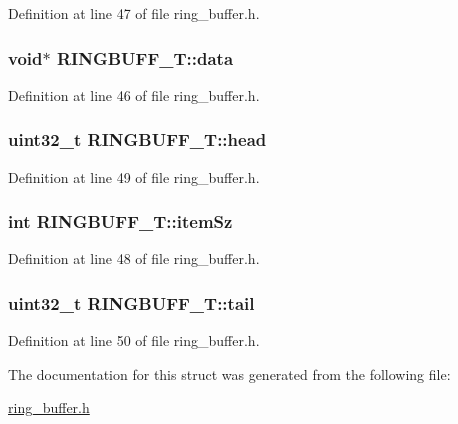 Definition at line 47 of file ring\+\_\+buffer.\+h.

\subsubsection[{\texorpdfstring{data}{data}}]{\setlength{\rightskip}{0pt plus 5cm}void$\ast$ R\+I\+N\+G\+B\+U\+F\+F\+\_\+\+T\+::data}\hypertarget{structRINGBUFF__T_a72858dc34b0dd618118388924c28967c}{}\label{structRINGBUFF__T_a72858dc34b0dd618118388924c28967c}


Definition at line 46 of file ring\+\_\+buffer.\+h.

\subsubsection[{\texorpdfstring{head}{head}}]{\setlength{\rightskip}{0pt plus 5cm}uint32\+\_\+t R\+I\+N\+G\+B\+U\+F\+F\+\_\+\+T\+::head}\hypertarget{structRINGBUFF__T_a30c2ea59e510513e18bb22b4c783e6bb}{}\label{structRINGBUFF__T_a30c2ea59e510513e18bb22b4c783e6bb}


Definition at line 49 of file ring\+\_\+buffer.\+h.

\subsubsection[{\texorpdfstring{item\+Sz}{itemSz}}]{\setlength{\rightskip}{0pt plus 5cm}int R\+I\+N\+G\+B\+U\+F\+F\+\_\+\+T\+::item\+Sz}\hypertarget{structRINGBUFF__T_a8d36d35edc73f36f7f81e98693ef3259}{}\label{structRINGBUFF__T_a8d36d35edc73f36f7f81e98693ef3259}


Definition at line 48 of file ring\+\_\+buffer.\+h.

\subsubsection[{\texorpdfstring{tail}{tail}}]{\setlength{\rightskip}{0pt plus 5cm}uint32\+\_\+t R\+I\+N\+G\+B\+U\+F\+F\+\_\+\+T\+::tail}\hypertarget{structRINGBUFF__T_a490ce2de2b2e234beeafdb9f9298f20f}{}\label{structRINGBUFF__T_a490ce2de2b2e234beeafdb9f9298f20f}


Definition at line 50 of file ring\+\_\+buffer.\+h.



The documentation for this struct was generated from the following file\+:\begin{DoxyCompactItemize}
\item 
\hyperlink{ring__buffer_8h}{ring\+\_\+buffer.\+h}\end{DoxyCompactItemize}
